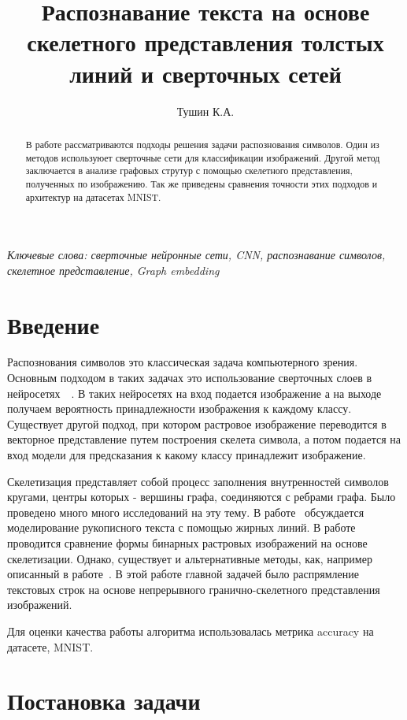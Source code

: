 \documentclass{llncs}
\title{Распознавание текста на основе скелетного представления толстых линий и сверточных сетей }
\author{Тушин К.А.}
\institute{Московский физико-технический институт (Государственный университет) \\ \email{tushin.ka@phystech.edu}}
\begin{document}
\maketitle

\begin{abstract}
В работе рассматриваются подходы решения задачи распознования символов. Один из методов используюет сверточные сети для классификации изображений. Другой метод заключается в анализе графовых струтур с помощью скелетного представления, полученных по изображению. Так же приведены сравнения точности этих подходов и архитектур на датасетах MNIST.
\end{abstract}

\textit{Ключевые слова: сверточные нейронные сети, CNN, распознавание символов, скелетное представление, Graph embedding}

\section{Введение}
Распознования символов это классическая задача компьютерного зрения. Основным подходом в таких задачах это использование сверточных слоев в нейросетях~\cite{cnn_lecun}~\cite{cnn_appl}. В таких нейросетях на вход подается изображение а на выходе получаем вероятность принадлежности изображения к каждому классу. Существует другой подход, при котором растровое изображение переводится в векторное представление путем построения скелета символа, а потом подается на вход модели для предсказания к какому классу принадлежит изображение.

Скелетизация представляет собой процесс заполнения внутренностей символов кругами, центры которых - вершины графа, соединяются с ребрами графа. Было проведено много много исследований на эту тему. В работе~\cite{graphs_gen} обсуждается моделирование рукописного текста с помощью жирных линий. В работе~\cite{graphs_shape_comp} проводится сравнение формы бинарных растровых изображений на основе скелетизации. Однако, существует и альтернативные методы, как, например описанный в работе~\cite{graphs_alt_method}. В этой работе главной задачей было распрямление текстовых строк на основе непрерывного гранично-скелетного представления изображений. 

Для оценки качества работы алгоритма использовалась метрика accuracy
на датасете, MNIST.

\section{Постановка задачи}
\end{document}
